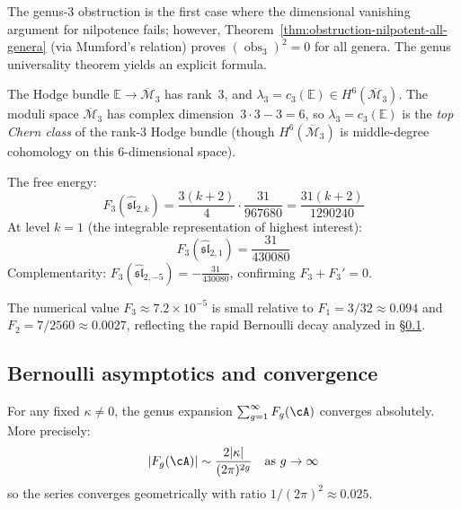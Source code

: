 \begin{computation}\label{comp:genus-3-sl2}
The genus-3 obstruction is the first case where the dimensional vanishing argument for nilpotence fails; however, Theorem~\ref{thm:obstruction-nilpotent-all-genera} (via Mumford's relation) proves $(\operatorname{obs}_3)^2 = 0$ for all genera.  The genus universality theorem yields an explicit formula.

The Hodge bundle $\mathbb{E} \to \overline{\mathcal{M}}_3$ has rank~$3$, and $\lambda_3 = c_3(\mathbb{E}) \in H^6(\overline{\mathcal{M}}_3)$.  The moduli space $\overline{\mathcal{M}}_3$ has complex dimension~$3 \cdot 3 - 3 = 6$, so $\lambda_3 = c_3(\mathbb{E})$ is the \emph{top Chern class} of the rank-$3$ Hodge bundle (though $H^6(\overline{\mathcal{M}}_3)$ is middle-degree cohomology on this $6$-dimensional space).

The free energy:
\[
F_3(\widehat{\mathfrak{sl}}_{2,k}) = \frac{3(k+2)}{4} \cdot \frac{31}{967680}
= \frac{31(k+2)}{1290240}
\]
At level $k = 1$ (the integrable representation of highest interest):
\begin{equation}\label{eq:genus3-k1}
F_3(\widehat{\mathfrak{sl}}_{2,1}) = \frac{31}{430080}
\end{equation}
Complementarity: $F_3(\widehat{\mathfrak{sl}}_{2,-5}) = -\frac{31}{430080}$, confirming $F_3 + F_3' = 0$.

The numerical value $F_3 \approx 7.2 \times 10^{-5}$ is small relative to $F_1 = 3/32 \approx 0.094$ and $F_2 = 7/2560 \approx 0.0027$, reflecting the rapid Bernoulli decay analyzed in \S\ref{subsec:bernoulli-asymptotics}.
\end{computation}

\subsection{Bernoulli asymptotics and convergence}\label{subsec:bernoulli-asymptotics}

\begin{proposition}\label{prop:genus-expansion-convergence}
For any fixed $\kappa \neq 0$, the genus expansion $\sum_{g=1}^\infty F_g(\cA)$ converges absolutely.  More precisely:
\begin{equation}\label{eq:Fg-asymptotics}
|F_g(\cA)| \sim \frac{2|\kappa|}{(2\pi)^{2g}} \quad \text{as } g \to \infty
\end{equation}
so the series converges geometrically with ratio $1/(2\pi)^2 \approx 0.025$.
\end{proposition}

